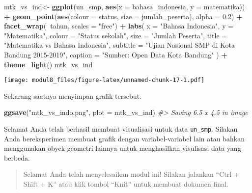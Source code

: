 \documentclass[
]{article}
\newenvironment{Shaded}{\begin{snugshade}}{\end{snugshade}}
\newcommand{\CommentTok}[1]{\textcolor[rgb]{0.56,0.35,0.01}{\textit{#1}}}
\newcommand{\DataTypeTok}[1]{\textcolor[rgb]{0.13,0.29,0.53}{#1}}
\newcommand{\FloatTok}[1]{\textcolor[rgb]{0.00,0.00,0.81}{#1}}
\newcommand{\KeywordTok}[1]{\textcolor[rgb]{0.13,0.29,0.53}{\textbf{#1}}}
\newcommand{\NormalTok}[1]{#1}
\newcommand{\OperatorTok}[1]{\textcolor[rgb]{0.81,0.36,0.00}{\textbf{#1}}}
\newcommand{\StringTok}[1]{\textcolor[rgb]{0.31,0.60,0.02}{#1}}
\begin{document}
\begin{Shaded}
\begin{Highlighting}[]
\NormalTok{mtk_vs_ind<-}\StringTok{ }\KeywordTok{ggplot}\NormalTok{(un_smp, }\KeywordTok{aes}\NormalTok{(}\DataTypeTok{x =}\NormalTok{ bahasa_indonesia, }\DataTypeTok{y =}\NormalTok{ matematika)) }\OperatorTok{+}
\KeywordTok{geom_point}\NormalTok{(}\KeywordTok{aes}\NormalTok{(}\DataTypeTok{colour =}\NormalTok{ status, }\DataTypeTok{size =}\NormalTok{ jumlah_peserta), }\DataTypeTok{alpha =} \FloatTok{0.2}\NormalTok{) }\OperatorTok{+}
\KeywordTok{facet_wrap}\NormalTok{(}\OperatorTok{~}\NormalTok{tahun, }\DataTypeTok{scales =} \StringTok{"free"}\NormalTok{) }\OperatorTok{+}
\KeywordTok{labs}\NormalTok{(}
\DataTypeTok{x =} \StringTok{"Bahasa Indonesia"}\NormalTok{,}
\DataTypeTok{y =} \StringTok{"Matematika"}\NormalTok{,}
\DataTypeTok{colour =} \StringTok{"Status sekolah"}\NormalTok{,}
\DataTypeTok{size =} \StringTok{"Jumlah Peserta"}\NormalTok{,}
\DataTypeTok{title =} \StringTok{"Matematika vs Bahasa Indonesia"}\NormalTok{,}
\DataTypeTok{subtitle =} \StringTok{"Ujian Nasional SMP di Kota Bandung 2015-2019"}\NormalTok{,}
\DataTypeTok{caption =} \StringTok{"Sumber: Open Data Kota Bandung"}
\NormalTok{) }\OperatorTok{+}
\KeywordTok{theme_light}\NormalTok{()}
\NormalTok{mtk_vs_ind}
\end{Highlighting}
\end{Shaded}

\texttt{[image: modul8\_files/figure-latex/unnamed-chunk-17-1.pdf]}

Sekarang saatnya menyimpan grafik tersebut.

\begin{Shaded}
\begin{Highlighting}[]
\KeywordTok{ggsave}\NormalTok{(}\StringTok{"mtk_vs_indo.png"}\NormalTok{, }\DataTypeTok{plot =}\NormalTok{ mtk_vs_ind)}
\CommentTok{#> Saving 6.5 x 4.5 in image}
\end{Highlighting}
\end{Shaded}

Selamat Anda telah berhasil membuat visualisasi untuk data
\texttt{un\_smp}. Silakan Anda bereksperimen membuat grafik dengan
variabel-variabel lain atau bahkan menggunakan obyek geometri lainnya
untuk menghasilkan visulisasi data yang berbeda.

\begin{quote}
Selamat Anda telah menyelesaikan modul ini! Silakan jalankan ``Ctrl +
Shift + K'' atau klik tombol ``Knit'' untuk membuat dokumen final.
\end{quote}
\end{document}
